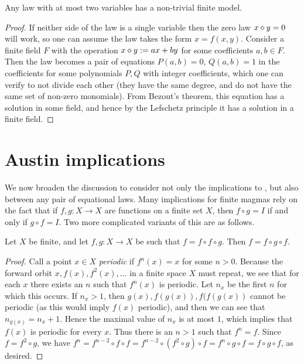 \begin{theorem}\label{austin-two}\leanok Any law with at most two variables has a non-trivial finite model.
\end{theorem}

\begin{proof} \leanok  If neither side of the law is a single variable then the zero law $x \diamond y = 0$ will work, so one can assume the law takes the form $x = f(x,y)$.  Consider a finite field $F$ with the operation $x \diamond y := ax+by$ for some coefficients $a,b \in F$.  Then the law becomes a pair of equations $P(a,b)=0$, $Q(a,b)=1$ in the coefficients for some polynomials $P,Q$ with integer coefficients, which one can verify to not divide each other (they have the same degree, and do not have the same set of non-zero monomials).  From Bezout's theorem, this equation has a solution in some field, and hence by the Lefschetz principle it has a solution in a finite field.
\end{proof}

\section{Austin implications}

We now broaden the discussion to consider not only the implications to , but also between any pair of equational laws.  Many implications for finite magmas rely on the fact that if $f, g:X \to X$ are functions on a finite set $X$, then $f \circ g = I$ if and only if $g \circ f = I$.  Two more complicated variants of this are as follows.

\begin{lemma}\label{ffg}  \leanok Let $X$ be finite, and let $f, g: X \to X$ be such that $f = f \circ f \circ g$.  Then $f = f \circ g \circ f$.
\end{lemma}

\begin{proof} \leanok Call a point $x \in X$ \emph{periodic} if $f^n(x) = x$ for some $n>0$.  Because the forward orbit $x, f(x), f^2(x), \dots$ in a finite space $X$ must repeat, we see that for each $x$ there exists an $n$ such that $f^n(x)$ is periodic.  Let $n_x$ be the first $n$ for which this occurs.  If $n_x > 1$, then $g(x), f(g(x)), f(f(g(x))$ cannot be periodic (as this would imply $f(x)$ periodic), and then we can see that $n_{g(x)} = n_x + 1$.  Hence the maximal value of $n_x$ is at most $1$, which implies that $f(x)$ is periodic for every $x$.  Thus there is an $n > 1$ such that $f^n = f$.  Since $f = f^2 \circ g$, we have $f^n = f^{n-2} \circ f \circ f = f^{n-2} \circ (f^2 \circ g) \circ f = f^n \circ g \circ f = f \circ g \circ f$, as desired.
\end{proof}

